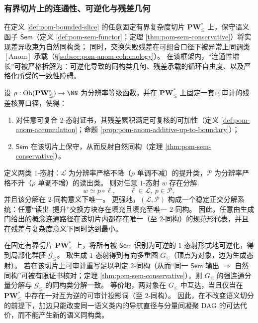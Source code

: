 
\subsubsection{有界切片上的连通性、可逆化与残差几何}\label{subsubsec:xi-bounded-slice-connectivity-residual-geometry}
在定义 \ref{def:pom-bounded-slice} 的任意固定有界复杂度切片 \(\mathbf{PW}^{\ast}_{\le}\) 上，保守语义函子 \(\mathsf{Sem}\)（定义 \ref{def:pom-sem-functor}；定理 \ref{thm:pom-sem-conservative}）将实现差异收束为自然同构类；
同时，交换失败残差在可组合口径下被异常上同调类 \([\mathrm{Anom}]\) 承载（\S\ref{subsec:pom-anom-cohomology}）。
在该框架内，“连通性增长”可被严格拆解为：可逆化导致的同构类几何、残差承载的循环自由度、以及严格化所受的一致性障碍。

\begin{conclusion}[审计可逆的正交因子分解与连通性正规形的唯一性]\label{con:xi-connectivity-orthogonal-factorization-normal-form}
设 \(\rho:\mathrm{Ob}(\mathbf{PW}^{\ast}_{\le})\to\NN\) 为分辨率等级函数，并在 \(\mathbf{PW}^{\ast}_{\le}\) 上固定一套可审计的残差核算口径，使得：
\begin{enumerate}
  \item 对任意可复合 \(2\)-态射证书，其残差累积满足可复核的可加性（定义 \ref{def:pom-anom-accumulation}；命题 \ref{prop:pom-anom-additive-up-to-boundary}）；
  \item \(\mathsf{Sem}\) 在该切片上保守，从而反射自然同构（定理 \ref{thm:pom-sem-conservative}）。
\end{enumerate}
定义两类 \(1\)-态射：\(\mathcal L\) 为分辨率严格不降（\(\rho\) 单调不减）的提升类，\(\mathcal P\) 为分辨率严格不升（\(\rho\) 单调不增）的读出类。
则对任意 \(1\)-态射 \(w\) 存在分解
\[
w\simeq p\circ \ell,\qquad \ell\in\mathcal L,\ p\in\mathcal P,
\]
并且该分解在 \(2\)-同构意义下唯一。
更强地，\((\mathcal L,\mathcal P)\) 构成一个稳定正交分解系统：任意“读出--提升”交换方块存在填充且填充至唯一 \(2\)-同构。
因此，任意由生成门给出的概念连通路径在该切片内都存在唯一（至 \(2\)-同构）的规范形代表，并且在残差与复杂度意义下同时达到最小。
\end{conclusion}

\begin{conclusion}\label{con:xi-connectivity-scc-invertible-closure}
在固定有界切片 \(\mathbf{PW}^{\ast}_{\le}\) 上，将所有被 \(\mathsf{Sem}\) 识别为可逆的 \(1\)-态射形式地可逆化，得到局部化群胚 \(\mathcal{G}_{\le}\)。
取生成 \(1\)-态射得到有向多重图 \(G_{\le}\)（顶点为对象，边为生成态射）。
若在该切片上可审计重写足以判定 \(2\)-同构（从而“同一 \(\mathsf{Sem}\) 输出 \(\Rightarrow\) 自然同构”可被有限证书核对；定理 \ref{thm:pom-sem-conservative}），则 \(G_{\le}\) 的强连通分量分解与 \(\mathcal{G}_{\le}\) 的同构类分解一致。
等价地，两对象在 \(G_{\le}\) 中互达，当且仅当在 \(\mathbf{PW}^{\ast}_{\le}\) 中存在一对互为逆的可审计投影词（至 \(2\)-同构）。
因此，在不改变语义切分的前提下，加边只能改变同一语义类内的导航直径与分量间凝聚 DAG 的可达代价，而不能产生新的语义同构类。
\end{conclusion}

